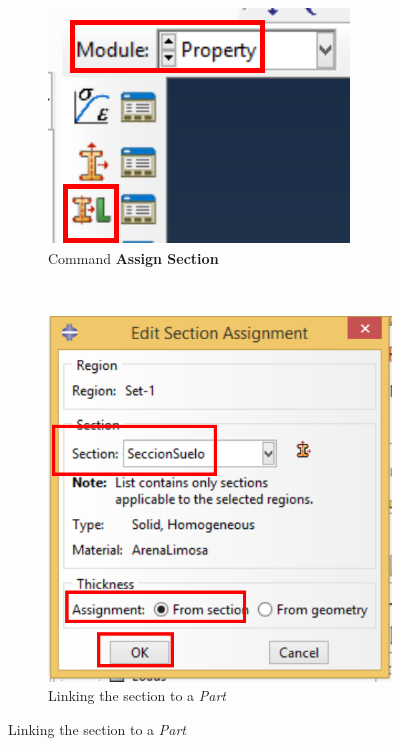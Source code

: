   \begin{figure}[!h]
    \centering
    \begin{subfigure}[!h]{0.20\textwidth}
      \includegraphics[width=\textwidth]{./body/images/prop05p.pdf}
      \caption{Command \textbf{Assign Section}}
      \label{prop05p}
    \end{subfigure}%
    ~
    \begin{subfigure}[!h]{0.39\textwidth}
      \includegraphics[width=\textwidth]{./body/images/prop06.pdf}
      \caption{Linking the section to a \textit{Part}}
      \label{prop06}
    \end{subfigure}%
    

\end{figure}
